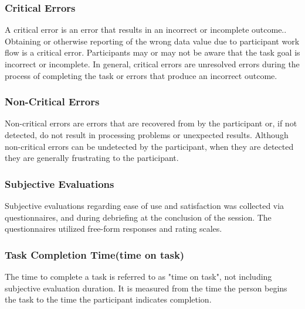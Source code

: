 \subsubsection{Critical Errors}
A critical error is an error that results in an incorrect or incomplete outcome.. Obtaining or otherwise reporting of the wrong data value due to participant work flow is a critical error. Participants may or may not be aware that the task goal is incorrect or incomplete. In general, critical errors are unresolved errors during the process of completing the task or errors that produce an incorrect outcome.

\subsubsection{Non-Critical Errors}
Non-critical errors are errors that are recovered from by the participant or, if not detected, do not result in processing problems or unexpected results. Although non-critical errors can be undetected by the participant, when they are detected they are generally frustrating to the participant.

\subsubsection{Subjective Evaluations}
Subjective evaluations regarding ease of use and satisfaction was collected via questionnaires, and during debriefing at the conclusion of the session. The questionnaires utilized free-form responses and rating scales.

\subsubsection{Task Completion Time(time on task)}
The time to complete a task is referred to as "time on task", not including subjective evaluation duration. It is measured from the time the person begins the task to the time the participant indicates completion.

